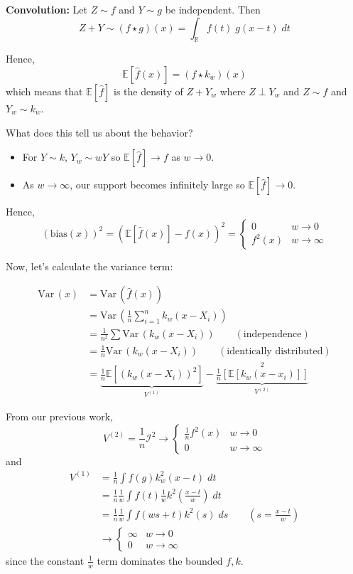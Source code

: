 \documentclass[12pt]{report}
\renewcommand{\hat}[1]{\widehat{#1}}
\newcommand{\R}{\mathbb{R}}
\newcommand{\E}{\mathbb{E}}
\newcommand{\Var}{\text{Var}\,}
\newcommand*{\tbf}[1]{\ifmmode\mathbf{#1}\else\textbf{#1}\fi}
\begin{document}
\tbf{Convolution:} Let $Z \sim f$ and $Y \sim g$ be independent. Then
\[Z + Y \sim (f \star g)(x) = \int_{\R} f(t)\; g(x - t)\; dt\]

Hence,
\[\E[\hat f(x)] = (f \star k_w)(x)\]
which means that $\E[\hat f]$ is the density of $Z + Y_w$ where $Z \perp Y_w$ and $Z \sim f$ and $Y_w \sim k_w$.

What does this tell us about the behavior?
\begin{itemize}
    \item For $Y \sim k$, $Y_w \sim wY$ so $\E[\hat f] \to f$ as $w \to 0$.
    \item As $w \to \infty$, our support becomes infinitely large so $\E[\hat f] \to 0$.
\end{itemize}

Hence,
\[(\text{bias}(x))^2 = (\E[\hat f(x)] - f(x))^2 = \begin{cases}
        0      & w\to 0      \\
        f^2(x) & w\to \infty
    \end{cases}\]

Now, let's calculate the variance term:

\begin{align*}
    \Var(x) & = \Var(\hat f(x))                                                                                              \\
            & = \Var\left(\frac{1}{n} \sum_{i=1}^n k_w(x - X_i)\right)                                                       \\
            & = \frac{1}{n^2} \sum \Var(k_w(x- X_i)) \qquad (\text{independence})                                            \\
            & = \frac{1}{n}\Var(k_w(x - X_i)) \qquad (\text{identically distributed})                                        \\
            & = \underbrace{\frac{1}{n}\E[(k_w(x- X_i))^2]}_{V^{(1)}} - \underbrace{\frac{1}{n}[\E[k_w(x-x_i)]]}_{V^{(2)}}^2
\end{align*}

From our previous work,
\[V^{(2)} = \frac{1}{n} \mathcal{I}^2 \to \begin{cases}
        \frac{1}{n} f^2(x) & w\to 0      \\
        0                  & w\to \infty
    \end{cases}\]
and
\begin{align*}
    V^{(1)} & = \frac{1}{n} \int f(g) k^2_w(x - t)\; dt                                           \\
            & = \frac{1}{n} \frac{1}{w}\int f(t) \frac{1}{w} k^2\left(\frac{x - t}{w}\right)\; dt \\
            & = \frac{1}{n} \frac{1}{w} \int f(ws + t) k^2(s)\; ds \qquad (s = \frac{x - t}{w})   \\
            & \to \begin{cases}
                      \infty & w\to 0      \\
                      0      & w\to \infty
                  \end{cases}
\end{align*}
since the constant $\frac{1}{w}$ term dominates the bounded $f, k$.
\end{document}
